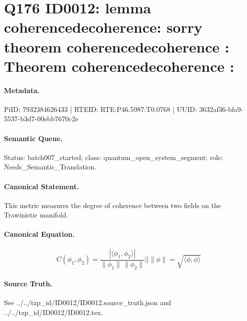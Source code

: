 \section*{Q176 ID0012: lemma coherencedecoherence: sorry theorem coherencedecoherence : Theorem coherencedecoherence :}
\paragraph{Metadata.}
PiID: 7932384626433 | RTEID: RTE:P46.5987:T0.0768 | UUID: 3632af36-bfa9-5537-b3d7-00ebb7670c2e

\paragraph{Semantic Queue.}
Status: batch007\_started; class: quantum\_open\_system\_segment; role: Needs\_Semantic\_Translation.

\paragraph{Canonical Statement.}
This metric measures the degree of coherence between two fields on the Trawinistic manifold.

\paragraph{Canonical Equation.}
\[
C(\phi_{1},\phi_{2}) = \frac{\left|\langle \phi_{1},\phi_{2}\rangle\right|} {\|\phi_{1}\|\,\|\phi_{2}\|} || \|\phi\| = \sqrt{\langle \phi,\phi\rangle}
\]

\paragraph{Source Truth.}
See ../../tzp\_id/ID0012/ID0012.source\_truth.json and ../../tzp\_id/ID0012/ID0012.tex.
